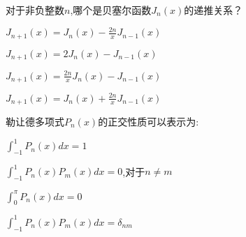 \documentclass{njustexam}
\begin{document}








\begin{problem}
  对于非负整数$n$,哪个是贝塞尔函数$J_n(x)$的递推关系？
  \begin{abcd}
    \item  $J_{n+1}(x) = J_n(x) - \frac{2n}{x} J_{n-1}(x)$
    \item  $J_{n+1}(x) = 2 J_n(x) - J_{n-1}(x)$
    \item  $J_{n+1}(x) = \frac{2n}{x} J_n(x) - J_{n-1}(x)$
    \item  $J_{n+1}(x) = J_n(x) + \frac{2n}{x} J_{n-1}(x)$
  \end{abcd}
\end{problem}

\begin{problem}
  勒让德多项式$P_n(x)$的正交性质可以表示为:
  \begin{abcd}
    \item $\int_{-1}^{1} P_n(x) dx = 1$

    \item $\int_{-1}^{1} P_n(x) P_m(x) dx = 0$,对于$n \neq m$
    
    \item $\int_{0}^{\pi} P_n(x) dx = 0$
    
    \item $\int_{-1}^{1} P_n(x) P_m(x) dx = \delta_{nm}$
  \end{abcd}
\end{problem}
\end{document}

